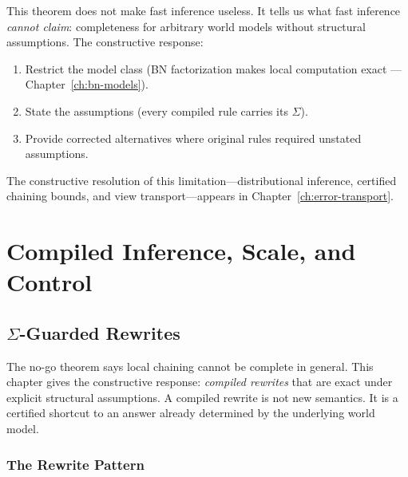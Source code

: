 \documentclass[11pt,openany]{report}
\begin{document}
\noindent
This theorem does not make fast inference useless.  It tells us what
fast inference \emph{cannot claim}: completeness for arbitrary world
models without structural assumptions.  The constructive response:
\begin{enumerate}
\item Restrict the model class (BN factorization makes local
  computation exact --- Chapter~\ref{ch:bn-models}).
\item State the assumptions (every compiled rule carries its $\Sigma$).
\item Provide corrected alternatives where original rules required
  unstated assumptions.
\end{enumerate}


\noindent
The constructive resolution of this limitation---distributional
inference, certified chaining bounds, and view transport---appears
in Chapter~\ref{ch:error-transport}.


\part{Compiled Inference, Scale, and Control}
\label{part:compiled}

\chapter{\texorpdfstring{$\Sigma$}{Sigma}-Guarded Rewrites}
\label{ch:sigma-rewrites}

The no-go theorem says local chaining cannot be complete in general.
This chapter gives the constructive response: \emph{compiled
rewrites} that are exact under explicit structural assumptions.  A
compiled rewrite is not new semantics.  It is a certified shortcut to
an answer already determined by the underlying world model.

\section{The Rewrite Pattern}
\end{document}
